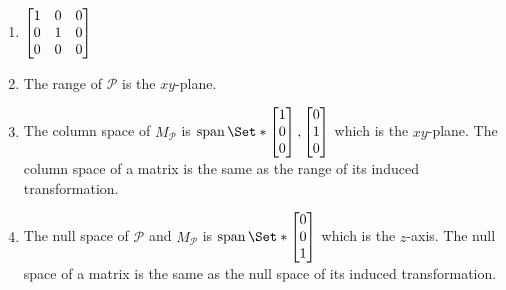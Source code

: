 \begin{exercises}
\begin{problist}
		\begin{solution}
			\begin{enumerate}
				\item $\mat{1&0&0\\0&1&0\\0&0&0}$
				\item The range of $\mathcal{P}$ is the $xy$-plane.
				\item The column space of $M_\mathcal{P}$ is $\Span\Set*{\mat{1\\0\\0},\mat{0\\1\\0}}$ which is the $xy$-plane. The column space of a matrix is the same as the range of its induced transformation.
				\item The null space of $\mathcal{P}$ and $M_\mathcal{P}$ is $\Span\Set*{\mat{0\\0\\1}}$ which is the $z$-axis. The null space of a matrix is the same as the null space of its induced transformation.
			\end{enumerate}
		\end{solution}

	\end{problist}
\end{exercises}
